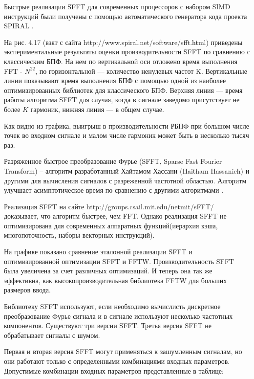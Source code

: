 Быстрые реализации SFFT для современных процессоров с набором SIMD инструкций были получены с помощью автоматического генератора кода проекта SPIRAL \cite{schumacher2014high, spiral}.


На рис. 4.17 (взят с сайта http://www.spiral.net/software/sfft.html) приведены
экспериментальные результаты оценки производительности SFFT по сравнению с классическим БПФ.
На нем по вертикальной оси отложено время выполнения FFT - $N^{22}$,
по горизонтальной — количество ненулевых частот K. Вертикальные линии
показывают время выполнения БПФ с помощью одной из наиболее оптимизированных
библиотек для классического БПФ. Верхняя линия — время работы алгоритма SFFT для случая, когда в сигнале заведомо присутствует не более $K$ гармоник, нижняя линия — в общем случае.


Как видно из графика, выигрыш в производительности РБПФ при большом числе точек во входном сигнале и
малом числе гармоник может быть в несколько тысяч раз.
 
Разряженное быстрое преобразование Фурье (SFFT, Sparse Fast Fourier Transform) -- алгоритм разработанный Хайтамом Хассани (Haitham Hassanieh) и другими \cite{hassanieh2012simple} для вычисления сигналов с разреженной частотной областью. Алгоритм улучшает асимптотическое время по сравнению с другими алгоритмами \cite{hassanieh2012nearly}.

Реализация SFFT на сайте http://groups.csail.mit.edu/netmit/sFFT/
доказывает, что алгоритм быстрее, чем FFT. Однако реализация SFFT не оптимизирована для современных аппаратных функций(иерархия кэша, многопоточность, наборы векторных инструкций).

На графике показано сравнение эталонной реализации SFFT и оптимизированной оптимизации SFFT и FFTW. Производительность SFFT была увеличена за счет различных оптимизаций. И теперь она так же эффективна, как высокопроизводительная библиотека FFTW для больших размеров ввода.

Библиотеку SFFT используют, если необходимо вычислисть дискретное преобразование Фурье сигнала и в сигнале используют несколько частотных компонентов. Существуют три версии SFFT. Третья версия SFFT не обрабатывает сигналы с шумом.

Первая и вторая версия SFFT могут применяться к зашумленным сигналам, но они работают только с определенными комбинациями входных параметров. Допустимые комбинации входных параметров представленные в таблице:

